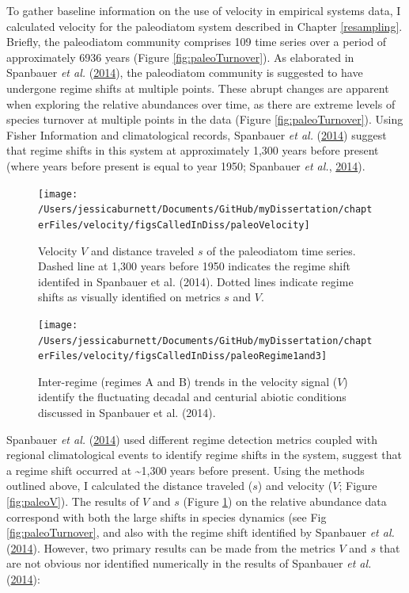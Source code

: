 \documentclass[12pt,twoside,openany]{reedthesis}
\begin{document}
To gather baseline information on the use of velocity in empirical systems data, I calculated velocity for the paleodiatom system described in Chapter \ref{resampling}. Briefly, the paleodiatom community comprises 109 time series over a period of approximately 6936 years (Figure \ref{fig:paleoTurnover}). As elaborated in Spanbauer \emph{et al.} (\protect\hyperlink{ref-spanbauer_prolonged_2014}{2014}), the paleodiatom community is suggested to have undergone regime shifts at multiple points. These abrupt changes are apparent when exploring the relative abundances over time, as there are extreme levels of species turnover at multiple points in the data (Figure \ref{fig:paleoTurnover}). Using Fisher Information and climatological records, Spanbauer \emph{et al.} (\protect\hyperlink{ref-spanbauer_prolonged_2014}{2014}) suggest that regime shifts in this system at approximately 1,300 years before present (where years before present is equal to year 1950; Spanbauer \emph{et al.}, \protect\hyperlink{ref-spanbauer_prolonged_2014}{2014}).
\begin{figure}[bth]

{\centering \texttt{[image: /Users/jessicaburnett/Documents/GitHub/myDissertation/chapterFiles/velocity/figsCalledInDiss/paleoVelocity]} 

}

\caption{Velocity $V$ and distance traveled $s$ of the paleodiatom time series. Dashed line at 1,300 years before 1950 indicates the regime shift identifed in Spanbauer et al. (2014). Dotted lines indicate regime shifts as visually identified on metrics $s$ and $V$.}\label{fig:paleoVelocity}
\end{figure}
\begin{figure}[bth]

{\centering \texttt{[image: /Users/jessicaburnett/Documents/GitHub/myDissertation/chapterFiles/velocity/figsCalledInDiss/paleoRegime1and3]} 

}

\caption{Inter-regime (regimes A and B) trends in the velocity signal ($V$) identify  the fluctuating decadal and centurial abiotic conditions discussed in  Spanbauer et al. (2014).}\label{fig:paleoRegime1and3}
\end{figure}
Spanbauer \emph{et al.} (\protect\hyperlink{ref-spanbauer_prolonged_2014}{2014}) used different regime detection metrics coupled with regional climatological events to identify regime shifts in the system, suggest that a regime shift occurred at \textasciitilde1,300 years before present. Using the methods outlined above, I calculated the distance traveled (\(s\)) and velocity (\(V\); Figure \ref{fig:paleoV}). The results of \(V\) and \(s\) (Figure \ref{fig:paleoVelocity}) on the relative abundance data correspond with both the large shifts in species dynamics (see Fig \ref{fig:paleoTurnover}, and also with the regime shift identified by Spanbauer \emph{et al.} (\protect\hyperlink{ref-spanbauer_prolonged_2014}{2014}). However, two primary results can be made from the metrics \(V\) and \(s\) that are not obvious nor identified numerically in the results of Spanbauer \emph{et al.} (\protect\hyperlink{ref-spanbauer_prolonged_2014}{2014}):
\end{document}
